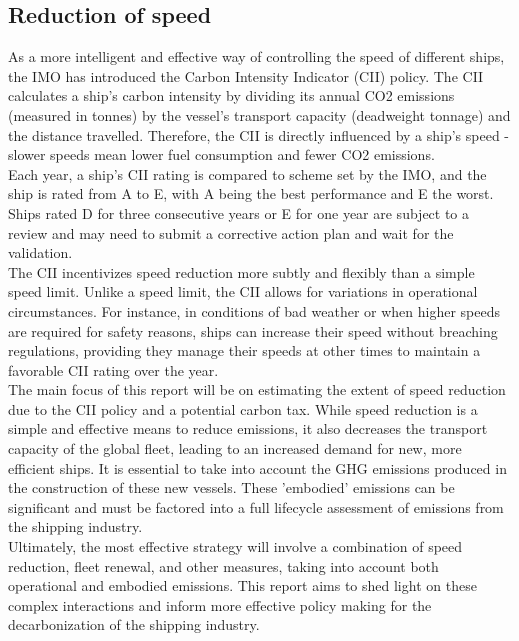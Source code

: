 \documentclass[a4paper,12pt]{article}
\begin{document}
\subsection{Reduction of speed}
As a more intelligent and effective way of controlling the speed of different ships, the IMO has introduced the Carbon Intensity Indicator (CII) policy.
The CII calculates a ship's carbon intensity by dividing its annual CO2 emissions (measured in tonnes) by the vessel's transport capacity (deadweight tonnage) and the distance travelled. Therefore, the CII is directly influenced by a ship's speed - slower speeds mean lower fuel consumption and fewer CO2 emissions.\\

Each year, a ship's CII rating is compared to scheme set by the IMO, and the ship is rated from A to E, with A being the best performance and E the worst.
Ships rated D for three consecutive years or E for one year are subject to a review and may need to submit a corrective action plan and wait for the validation.\\

The CII incentivizes speed reduction more subtly and flexibly than a simple speed limit. Unlike a speed limit, the CII allows for variations in operational circumstances.
For instance, in conditions of bad weather or when higher speeds are required for safety reasons, ships can increase their speed without breaching regulations, providing they manage their speeds at other times to maintain a favorable CII rating over the year.\\

The main focus of this report will be on estimating the extent of speed reduction due to the CII policy and a potential carbon tax.
While speed reduction is a simple and effective means to reduce emissions, it also decreases the transport capacity of the global fleet, leading to an increased demand for new, more efficient ships.
It is essential to take into account the GHG emissions produced in the construction of these new vessels.
These 'embodied' emissions can be significant and must be factored into a full lifecycle assessment of emissions from the shipping industry.\\

Ultimately, the most effective strategy will involve a combination of speed reduction, fleet renewal, and other measures, taking into account both operational and embodied emissions.
This report aims to shed light on these complex interactions and inform more effective policy making for the decarbonization of the shipping industry.
\end{document}
